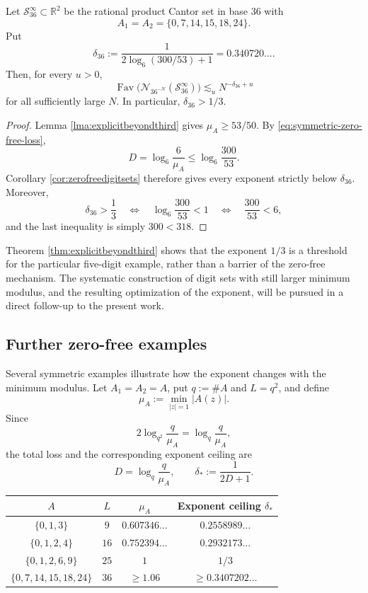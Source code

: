 \documentclass[12pt]{amsart}
\numberwithin{equation}{section}
\DeclareMathOperator{\Fav}{Fav}
\begin{document}
\begin{theorem}\label{thm:explicitbeyondthird}
Let $\mathcal S_{36}^\infty\subset\mathbb R^2$ be the rational product
Cantor set in base $36$ with
\[
 A_1=A_2=\{0,7,14,15,18,24\}.
\]
Put
\begin{equation}\label{eq:base36-exponent}
 \delta_{36}:=
 \frac1{2\log_6(300/53)+1}
 =0.340720\ldots.
\end{equation}
Then, for every $u>0$,
\[
 \Fav\bigl(\mathcal N_{36^{-N}}(\mathcal S_{36}^\infty)\bigr)
 \lesssim_u N^{-\delta_{36}+u}
\]
for all sufficiently large $N$.  In particular, $\delta_{36}>1/3$.
\end{theorem}

\begin{proof}
Lemma \ref{lma:explicitbeyondthird} gives $\mu_A\geq53/50$.  By
\eqref{eq:symmetric-zero-free-loss},
\[
 D=\log_6\frac6{\mu_A}
 \leq\log_6\frac{300}{53}.
\]
Corollary \ref{cor:zerofreedigitsets} therefore gives every exponent strictly
below $\delta_{36}$.  Moreover,
\[
 \delta_{36}>\frac13
 \quad\Longleftrightarrow\quad
 \log_6\frac{300}{53}<1
 \quad\Longleftrightarrow\quad
 \frac{300}{53}<6,
\]
and the last inequality is simply $300<318$.
\end{proof}

\begin{remark}
Theorem \ref{thm:explicitbeyondthird} shows that the exponent $1/3$ is a
threshold for the particular five-digit example, rather than a barrier of
the zero-free mechanism.  The systematic construction of digit sets with
still larger minimum modulus, and the resulting optimization of the exponent,
will be pursued in a direct follow-up to the present work.
\end{remark}

\subsection{Further zero-free examples}

Several symmetric examples illustrate how the exponent changes with the
minimum modulus.  Let $A_1=A_2=A$, put $q:=\#A$ and $L=q^2$, and define
\[
 \mu_A:=\min_{|z|=1}|A(z)|.
\]
Since
\[
 2\log_{q^2}\frac q{\mu_A}
 =\log_q\frac q{\mu_A},
\]
the total loss and the corresponding exponent ceiling are
\[
 D=\log_q\frac q{\mu_A},
 \qquad
 \delta_*:=\frac1{2D+1}.
\]

\begin{center}
\renewcommand{\arraystretch}{1.15}
\begin{tabular}{@{}c c c c@{}}
\toprule
$A$ & $L$ & $\mu_A$ & Exponent ceiling $\delta_*$\\
\midrule
$\{0,1,3\}$ & $9$ & $0.607346\ldots$ & $0.2558989\ldots$\\
$\{0,1,2,4\}$ & $16$ & $0.752394\ldots$ & $0.2932173\ldots$\\
$\{0,1,2,6,9\}$ & $25$ & $1$ & $1/3$\\
$\{0,7,14,15,18,24\}$ & $36$ & $\geq1.06$ & $\geq0.3407202\ldots$\\
\bottomrule
\end{tabular}
\end{center}
\end{document}

